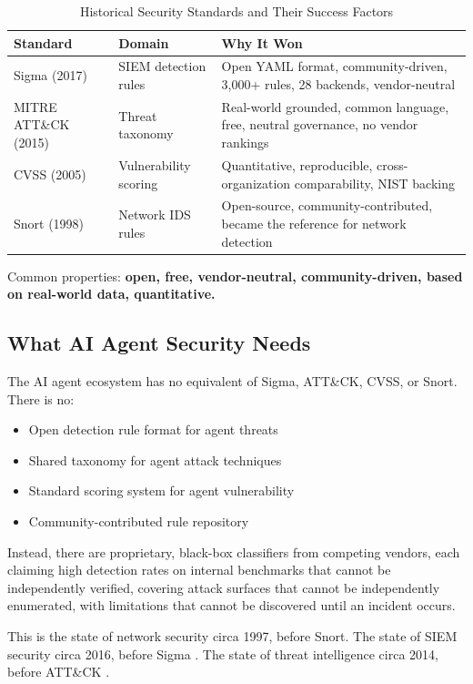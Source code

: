 \documentclass[11pt,letterpaper]{article}
\begin{document}
\begin{table}[htbp]
\centering
\caption{Historical Security Standards and Their Success Factors}
\label{tab:standards}
\begin{tabularx}{\textwidth}{llX}
\toprule
\textbf{Standard} & \textbf{Domain} & \textbf{Why It Won} \\
\midrule
Sigma (2017) \cite{sigma} & SIEM detection rules & Open YAML format, community-driven, 3,000+ rules, 28 backends, vendor-neutral \\
MITRE ATT\&CK (2015) \cite{mitreatlas} & Threat taxonomy & Real-world grounded, common language, free, neutral governance, no vendor rankings \\
CVSS (2005) & Vulnerability scoring & Quantitative, reproducible, cross-organization comparability, NIST backing \cite{nist} \\
Snort (1998) & Network IDS rules & Open-source, community-contributed, became the reference for network detection \\
\bottomrule
\end{tabularx}
\end{table}

Common properties: \textbf{open, free, vendor-neutral, community-driven, based on real-world data, quantitative.}


\subsection{What AI Agent Security Needs}

The AI agent ecosystem has no equivalent of Sigma, ATT\&CK, CVSS, or Snort. There is no:

\begin{itemize}
\item Open detection rule format for agent threats
\item Shared taxonomy for agent attack techniques
\item Standard scoring system for agent vulnerability
\item Community-contributed rule repository
\end{itemize}

Instead, there are proprietary, black-box classifiers from competing vendors, each claiming high detection rates on internal benchmarks that cannot be independently verified, covering attack surfaces that cannot be independently enumerated, with limitations that cannot be discovered until an incident occurs.

This is the state of network security circa 1997, before Snort. The state of SIEM security circa 2016, before Sigma \cite{sigma}. The state of threat intelligence circa 2014, before ATT\&CK \cite{mitreatlas}.
\end{document}
